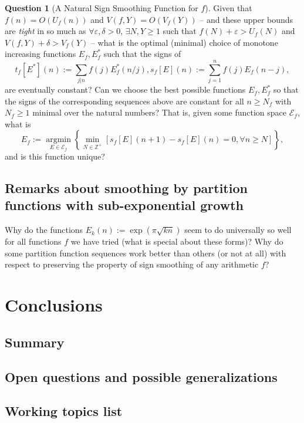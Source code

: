 \documentclass[11pt,reqno]{amsart}
\numberwithin{figure}{section}
\numberwithin{table}{section}
\theoremstyle{plain}
\numberwithin{theorem}{section}
\theoremstyle{definition}
\newtheorem{question}[theorem]{Question}
\begin{document}
\begin{question}[A Natural Sign Smoothing Function for $f$]
Given that $f(n) = O(U_f(n))$ and $V(f, Y) = O(V_f(Y))$ -- and these upper bounds are \emph{tight} in so much as 
$\forall \varepsilon, \delta>0$, $\exists N, Y \geq 1$ such that $f(N) + \varepsilon > U_f(N)$ and 
$V(f, Y) + \delta > V_f(Y)$ -- 
what is the optimal (minimal) choice of 
monotone increasing functions $E_f, E_f^{\ast}$ such that the signs of 
\[
t_f[E^{\ast}](n) := \sum_{j|n} f(j) E_f^{\ast}(n/j), s_f[E](n) := \sum_{j=1}^{n} f(j) E_f(n-j), 
\]
are eventually constant? Can we choose the best possible functions $E_f, E_f^{\ast}$ so that the signs of the 
corresponding sequences above are constant for all $n \geq N_f$ with $N_f \geq 1$ minimal over the natural 
numbers? That is, given some function space $\mathcal{E}_f$, what is 
\[
E_f := \operatorname{argmin}\limits_{E \in \mathcal{E}_f} \left\{ 
     \min_{N \in \mathbb{Z}^{+}} \left[s_f[E](n+1) - s_f[E](n) = 0, \forall n \geq N
     \right]\right\}, 
\]
and is this function unique? 
\end{question} 

\subsection{Remarks about smoothing by partition functions with sub-exponential growth} 

Why do the functions $E_k(n) := \exp(\pi \sqrt{kn})$ seem to do universally so well for all functions $f$ 
we have tried (what is special about these forms)? Why do some partition function sequences work better than 
others (or not at all) with respect to preserving the property of sign smoothing of any arithmetic $f$? 

\section{Conclusions} 

\subsection{Summary} 

\subsection{Open questions and possible generalizations} 

\subsection{Working topics list} 
\end{document}
